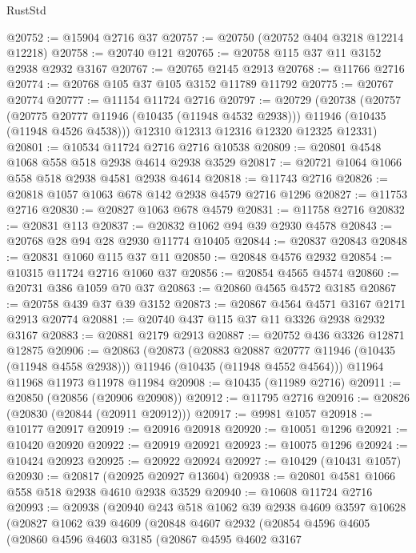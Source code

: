 \begin{lexlean}{RustStd}
\begin{coremodule}
{\begin{coremodule}
{{{{{{{{{{{{{{{{{{{{{{{{{{{{{{{{{{{{{{{{{{{{{{{{{{{{{{{{{{{{{{{{{{{{{{{{{{{{{{@20752 := @15904 @2716 @37
@20757 := @20750 (@20752 @404 @3218 @12214 @12218)
@20758 := @20740 @121
@20765 := @20758 @115 @37 @11 @3152 @2938 @2932 @3167
@20767 := @20765 @2145 @2913
@20768 := @11766 @2716
@20774 := @20768 @105 @37 @105 @3152 @11789 @11792
@20775 := @20767 @20774
@20777 := @11154 @11724 @2716
@20797 := @20729
    (@20738
      (@20757
        (@20775 @20777 @11946 (@10435 (@11948 @4532 @2938)))
        @11946
        (@10435 (@11948 @4526 @4538)))
      @12310
      @12313
      @12316
      @12320
      @12325
      @12331)
@20801 := @10534 @11724 @2716 @2716 @10538
@20809 := @20801 @4548 @1068 @558 @518 @2938 @4614 @2938 @3529
@20817 := @20721 @1064 @1066 @558 @518 @2938 @4581 @2938 @4614
@20818 := @11743 @2716
@20826 := @20818 @1057 @1063 @678 @142 @2938 @4579 @2716 @1296
@20827 := @11753 @2716
@20830 := @20827 @1063 @678 @4579
@20831 := @11758 @2716
@20832 := @20831 @113
@20837 := @20832 @1062 @94 @39 @2930 @4578
@20843 := @20768 @28 @94 @28 @2930 @11774 @10405
@20844 := @20837 @20843
@20848 := @20831 @1060 @115 @37 @11
@20850 := @20848 @4576 @2932
@20854 := @10315 @11724 @2716 @1060 @37
@20856 := @20854 @4565 @4574
@20860 := @20731 @386 @1059 @70 @37
@20863 := @20860 @4565 @4572 @3185
@20867 := @20758 @439 @37 @39 @3152
@20873 := @20867 @4564 @4571 @3167 @2171 @2913 @20774
@20881 := @20740 @437 @115 @37 @11 @3326 @2938 @2932 @3167
@20883 := @20881 @2179 @2913
@20887 := @20752 @436 @3326 @12871 @12875
@20906 := @20863
    (@20873
      (@20883 @20887 @20777 @11946 (@10435 (@11948 @4558 @2938)))
      @11946
      (@10435 (@11948 @4552 @4564)))
    @11964
    @11968
    @11973
    @11978
    @11984
@20908 := @10435 (@11989 @2716)
@20911 := @20850 (@20856 (@20906 @20908))
@20912 := @11795 @2716
@20916 := @20826 (@20830 (@20844 (@20911 @20912)))
@20917 := @9981 @1057
@20918 := @10177 @20917
@20919 := @20916 @20918
@20920 := @10051 @1296
@20921 := @10420 @20920
@20922 := @20919 @20921
@20923 := @10075 @1296
@20924 := @10424 @20923
@20925 := @20922 @20924
@20927 := @10429 (@10431 @1057)
@20930 := @20817 (@20925 @20927 @13604)
@20938 := @20801 @4581 @1066 @558 @518 @2938 @4610 @2938 @3529
@20940 := @10608 @11724 @2716
@20993 := @20938
    (@20940
      @243
      @518
      @1062
      @39
      @2938
      @4609
      @3597
      @10628
      (@20827
        @1062
        @39
        @4609
        (@20848
          @4607
          @2932
          (@20854
            @4596
            @4605
            (@20860
              @4596
              @4603
              @3185
              (@20867
                @4595
                @4602
                @3167
}}}}}}}}}}}}}}}}}}}}}}}}}}}}}}}}}}}}}}}}}}}}}}}}}}}}}}}}}}}}}}}}}}}}}}}}}}}}}}
\end{coremodule}}
\end{coremodule}
\end{lexlean}
